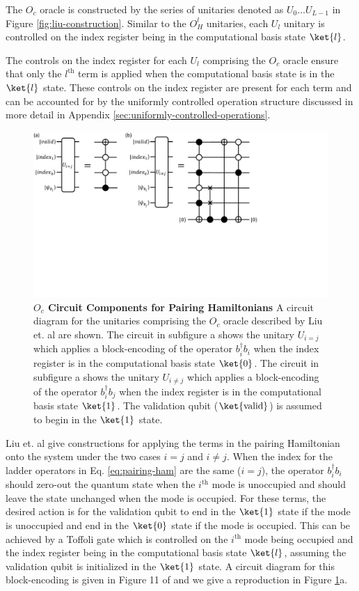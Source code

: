 The $O_c$ oracle is constructed by the series of unitaries denoted as $U_0 \dots U_{L - 1}$ in Figure \ref{fig:liu-construction}.
Similar to the $O_H^l$ unitaries, each $U_l$ unitary is controlled on the index register being in the computational basis state $\ket{l}$.

The controls on the index register for each $U_l$ comprising the $O_c$ oracle ensure that only the $l^\text{th}$ term is applied when the computational basis state is in the $\ket{l}$ state.
These controls on the index register are present for each term and can be accounted for by the uniformly controlled operation structure discussed in more detail in Appendix \ref{sec:uniformly-controlled-operations}.

\begin{figure}[h]
    \includegraphics[width=12cm]{figures/liu-O_c.pdf}
    \caption{
        \textbf{$O_c$ Circuit Components for Pairing Hamiltonians}
        A circuit diagram for the unitaries comprising the $O_c$ oracle described by Liu et. al \cite{liu2024efficient} are shown.
        The circuit in subfigure a shows the unitary $U_{i = j}$ which applies a block-encoding of the operator $b_i^\dagger b_i$ when the index register is in the computational basis state $\ket{0}$. 
        The circuit in subfigure a shows the unitary $U_{i \neq j}$ which applies a block-encoding of the operator $b_i^\dagger b_j$ when the index register is in the computational basis state $\ket{1}$.
        The validation qubit ($\ket{\text{valid}}$) is assumed to begin in the $\ket{1}$ state.
    }
    \label{fig:liu-O_c}
\end{figure}

Liu et. al give constructions for applying the terms in the pairing Hamiltonian onto the system under the two cases $i = j$ and $i \neq j$.
When the index for the ladder operators in Eq. \ref{eq:pairing-ham} are the same ($i = j$), the operator $b_i^\dagger b_i$ should zero-out the quantum state when the $i^\text{th}$ mode is unoccupied and should leave the state unchanged when the mode is occupied. 
For these terms, the desired action is for the validation qubit to end in the $\ket{1}$ state if the mode is unoccupied and end in the $\ket{0}$ state if the mode is occupied.
This can be achieved by a Toffoli gate which is controlled on the $i^\text{th}$ mode being occupied and the index register being in the computational basis state $\ket{l}$, assuming the validation qubit is initialized in the $\ket{1}$ state.
A circuit diagram for this block-encoding is given in Figure 11 of \cite{liu2024efficient} and we give a reproduction in Figure \ref{fig:liu-O_c}a.

